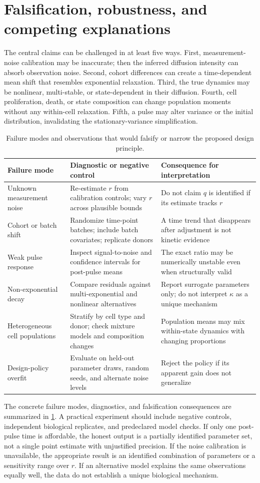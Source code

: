 \documentclass[11pt,a4paper]{article}
\begin{document}
\section{Falsification, robustness, and competing explanations}
The central claims can be challenged in at least five ways. First, measurement-noise calibration may be inaccurate; then the inferred diffusion intensity can absorb observation noise. Second, cohort differences can create a time-dependent mean shift that resembles exponential relaxation. Third, the true dynamics may be nonlinear, multi-stable, or state-dependent in their diffusion. Fourth, cell proliferation, death, or state composition can change population moments without any within-cell relaxation. Fifth, a pulse may alter variance or the initial distribution, invalidating the stationary-variance simplification.
\begin{table}[!htbp]
\centering
\small
\caption{Failure modes and observations that would falsify or narrow the proposed design principle.}
\label{tab:falsification}
\begin{tabularx}{\linewidth}{@{}p{2.2cm}X X@{}}
\toprule
Failure mode & Diagnostic or negative control & Consequence for interpretation\\
\midrule
Unknown measurement noise & Re-estimate $r$ from calibration controls; vary $r$ across plausible bounds & Do not claim $q$ is identified if its estimate tracks $r$\\
Cohort or batch shift & Randomize time-point batches; include batch covariates; replicate donors & A time trend that disappears after adjustment is not kinetic evidence\\
Weak pulse response & Inspect signal-to-noise and confidence intervals for post-pulse means & The exact ratio may be numerically unstable even when structurally valid\\
Non-exponential decay & Compare residuals against multi-exponential and nonlinear alternatives & Report surrogate parameters only; do not interpret $\kappa$ as a unique mechanism\\
Heterogeneous cell populations & Stratify by cell type and donor; check mixture models and composition changes & Population means may mix within-state dynamics with changing proportions\\
Design-policy overfit & Evaluate on held-out parameter draws, random seeds, and alternate noise levels & Reject the policy if its apparent gain does not generalize\\
\bottomrule
\end{tabularx}
\end{table}
The concrete failure modes, diagnostics, and falsification consequences are summarized in \cref{tab:falsification}. A practical experiment should include negative controls, independent biological replicates, and predeclared model checks. If only one post-pulse time is affordable, the honest output is a partially identified parameter set, not a single point estimate with unjustified precision. If the noise calibration is unavailable, the appropriate result is an identified combination of parameters or a sensitivity range over $r$. If an alternative model explains the same observations equally well, the data do not establish a unique biological mechanism.
\end{document}
